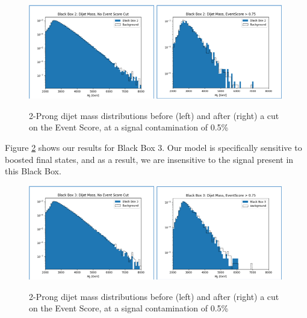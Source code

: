 \documentclass[letterpaper,11pt]{article}
\begin{document}
\begin{figure}[h!]
	\begin{center}
		\includegraphics[width=0.49\textwidth]{imgs/BB2.png}
		\includegraphics[width=0.49\textwidth]{imgs/BB2_Cut.png}
	\end{center}
	\caption{2-Prong dijet mass distributions before (left) and after (right) a cut on the Event Score, at a signal contamination of 0.5\%}
	\label{fig:bb2}
\end{figure}

Figure \ref{fig:bb3} shows our results for Black Box 3. Our model is specifically sensitive to boosted final states, and as a result, we are insensitive to the signal present in this Black Box. 

\begin{figure}[h!]
	\begin{center}
		\includegraphics[width=0.49\textwidth]{imgs/BB3.png}
		\includegraphics[width=0.49\textwidth]{imgs/BB3_Cut.png}
	\end{center}
	\caption{2-Prong dijet mass distributions before (left) and after (right) a cut on the Event Score, at a signal contamination of 0.5\%}
	\label{fig:bb3}
\end{figure}
\end{document}

